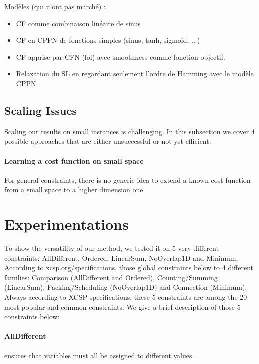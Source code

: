 \documentclass{article}
\begin{document}
Modèles (qui n'ont pas marché) :
\begin{itemize}
\item CF comme combinaison linéaire de sinus
\item CF en CPPN de fonctions simples (sinus, tanh, sigmoid, ...)
\item CF apprise par CFN (lol) avec smoothness comme fonction objectif.
\item Relaxation du SL en regardant seulement l'ordre de Hamming avec le modèle CPPN.
\end{itemize}

\subsection{Scaling Issues}\label{subsec:issues}
Scaling  our  results  on  small instances  is  challenging.  In  this
subsection we cover 4 possible approaches that are either unsuccessful
or not yet efficient.

\paragraph{Learning a cost function on small space}
For general constraints, there is no generic idea to extend a known cost
function from a small space to a higher dimension one.

\section{Experimentations}\label{sec:xp}

To  show  the versatility  of  our  method, we  tested  it  on 5  very
different constraints:  AllDifferent, Ordered,  LinearSum, NoOverlap1D
and                Minimum.                According                to
\href{http://xcsp.org/specifications}{xcsp.org/specifications},  those
global  constraints   below  to   4  different   families:  Comparison
(AllDifferent    and     Ordered),    Counting/Summing    (LinearSum),
Packing/Scheduling  (NoOverlap1D)  and Connection  (Minimum).   Always
according to XCSP specifications, these 5 constraints are among the 20
most popular  and common constraints.  We give a brief  description of
those 5 constraints below:

\paragraph{AllDifferent} ensures  that variables must all  be assigned
to different values.
\end{document}
